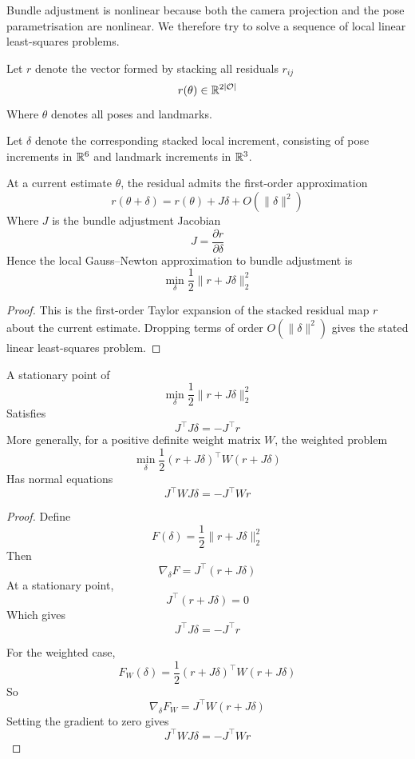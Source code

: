 \documentclass[11pt]{article}
\begin{document}
Bundle adjustment is nonlinear because both the camera projection and the pose parametrisation are nonlinear. We therefore try to solve a sequence of local linear least-squares problems.

\begin{definition}
Let \( r \) denote the vector formed by stacking all residuals \( r_{ij} \)
\[
r(\theta)
\in\mathbb{R}^{2|\mathcal O|}
\]
Where \(\theta\) denotes all poses and landmarks. 

Let \(\delta\) denote the corresponding stacked local increment, consisting of pose increments in \(\mathbb{R}^6\) and landmark increments in \(\mathbb{R}^3\).
\end{definition}

\begin{proposition}
At a current estimate \(\theta\), the residual admits the first-order approximation
\[
r(\theta+\delta)
=
r(\theta)+J\delta+O(\|\delta\|^2)
\]
Where \( J \) is the bundle adjustment Jacobian
\[
J=\frac{\partial r}{\partial \delta}
\]
Hence the local Gauss--Newton approximation to bundle adjustment is
\[
\min_\delta
\frac12
\|r+J\delta\|_2^2
\]
\end{proposition}

\begin{proof}
This is the first-order Taylor expansion of the stacked residual map \(r\) about the current estimate. Dropping terms of order \(O(\|\delta\|^2)\) gives the stated linear least-squares problem.
\end{proof}

\begin{proposition}
A stationary point of
\[
\min_\delta
\frac12
\|r+J\delta\|_2^2
\]
Satisfies
\[
J^\top J\delta=-J^\top r
\]
More generally, for a positive definite weight matrix \(W\), the weighted problem
\[
\min_\delta
\frac12
(r+J\delta)^\top W(r+J\delta)
\]
Has normal equations
\[
J^\top WJ\delta=-J^\top Wr
\]
\end{proposition}

\begin{proof}
Define
\[
F(\delta)=\frac12\|r+J\delta\|_2^2
\]
Then
\[
\nabla_\delta F
=
J^\top(r+J\delta)
\]
At a stationary point,
\[
J^\top(r+J\delta)=0
\]
Which gives
\[
J^\top J\delta=-J^\top r
\]

For the weighted case,
\[
F_W(\delta)=\frac12(r+J\delta)^\top W(r+J\delta)
\]
So
\[
\nabla_\delta F_W
=
J^\top W(r+J\delta)
\]
Setting the gradient to zero gives
\[
J^\top WJ\delta=-J^\top Wr
\]
\end{proof}
\end{document}
